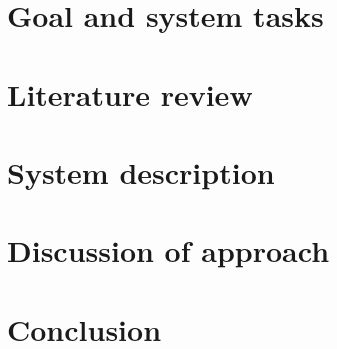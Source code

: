 \documentclass[12pt, a4paper]{article}
\begin{document}
\section{Goal and system tasks}

\section{Literature review}

\section{System description}

\section{Discussion of approach}

\section{Conclusion}
\begin{thebibliography}{x}

\end{thebibliography}
\end{document}
